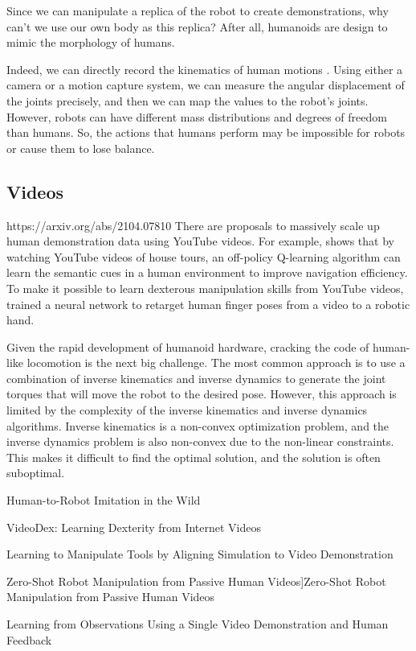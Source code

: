Since we can manipulate a replica of the robot to create demonstrations, why can't we use our own body as this replica? After all, humanoids are design to mimic the morphology of humans. 


Indeed, we can directly record the kinematics of human motions \cite{Billard:2013}. Using either a camera or a motion capture system, we can measure the angular displacement of the joints precisely, and then we can map the values to the robot's joints. However, robots can have different mass distributions and degrees of freedom than humans. So, the actions that humans perform may be impossible for robots or cause them to lose balance. 

\subsection{Videos}

https://arxiv.org/abs/2104.07810
There are proposals to massively scale up human demonstration data using YouTube videos. For example, \cite{chang2020semantic} shows that by watching YouTube videos of house tours, an off-policy Q-learning algorithm can learn the semantic cues in a human environment to improve navigation efficiency. To make it possible to learn dexterous manipulation skills from YouTube videos, \cite{sivakumar2022robotic} trained a neural network to retarget human finger poses from a video to a robotic hand. 

Given the rapid development of humanoid hardware, cracking the code of human-like locomotion is the next big challenge. The most common approach is to use a combination of inverse kinematics and inverse dynamics to generate the joint torques that will move the robot to the desired pose. However, this approach is limited by the complexity of the inverse kinematics and inverse dynamics algorithms. Inverse kinematics is a non-convex optimization problem, and the inverse dynamics problem is also non-convex due to the non-linear constraints. This makes it difficult to find the optimal solution, and the solution is often suboptimal.

Human-to-Robot Imitation in the Wild

VideoDex: Learning Dexterity from Internet Videos

Learning to Manipulate Tools by Aligning Simulation to Video Demonstration

Zero-Shot Robot Manipulation from Passive Human Videos]Zero-Shot Robot Manipulation from Passive Human Videos


Learning from Observations Using a Single Video Demonstration and Human Feedback


